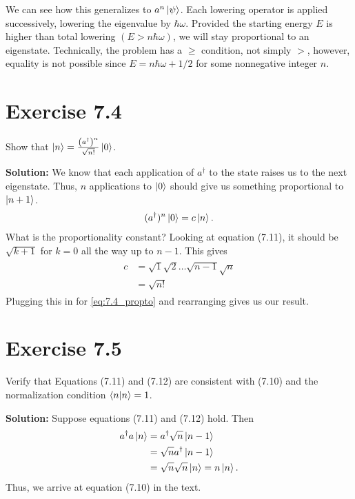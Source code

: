 \documentclass{book}
\begin{document}
    We can see how this generalizes to $a^n \ket{\psi}$. Each lowering operator is applied successively, lowering the eigenvalue by $\hbar \omega$. Provided the starting energy $E$ is higher than total lowering $(E > n \hbar \omega)$, we will stay proportional to an eigenstate. Technically, the problem has a $\geq$ condition, not simply $>$, however, equality is not possible since $E = n\hbar \omega + 1/2$ for some nonnegative integer $n$.

\section*{Exercise 7.4}
    Show that $\ket{n} = \frac{\left(a^\dagger\right)^n}{\sqrt{n!}} \ket{0}$.

    \textbf{Solution:} We know that each application of $a^\dagger$ to the state raises us to the next eigenstate. Thus, $n$ applications to $\ket{0}$ should give us something proportional to $\ket{n+1}$.
    \begin{align} \label{eq:7.4_propto}
        (a^\dagger)^n \ket{0} = c \ket{n}.
    \end{align}
    What is the proportionality constant? Looking at equation (7.11), it should be $\sqrt{k+1}$ for $k = 0$ all the way up to $n-1$. This gives
    \begin{align}
    \begin{aligned}
        c &= \sqrt{1}\sqrt{2} \dots \sqrt{n-1} \sqrt{n} \\
        &= \sqrt{n!}
    \end{aligned}
    \end{align}
    Plugging this in for \eqref{eq:7.4_propto} and rearranging gives us our result.

\section*{Exercise 7.5}
    Verify that Equations (7.11) and (7.12) are consistent with (7.10) and the normalization condition $\bra{n}\ket{n} = 1$.

    \textbf{Solution:} Suppose equations (7.11) and (7.12) hold. Then
    \begin{align}
    \begin{aligned}
        a^\dagger a \ket{n} &= a^\dagger \sqrt{n}\ket{n-1} \\
        &= \sqrt{n} a^\dagger \ket{n-1} \\
        &= \sqrt{n} \sqrt{n} \ket{n} = n \ket{n}.
    \end{aligned}
    \end{align}
    Thus, we arrive at equation (7.10) in the text.
    
\end{document}
